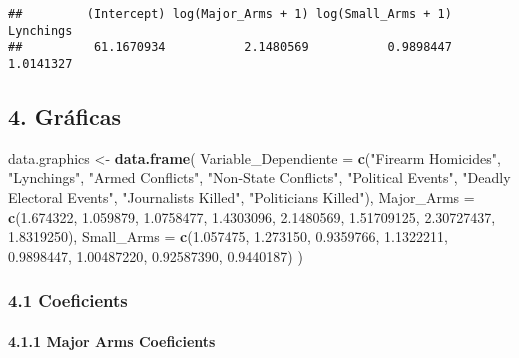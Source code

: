\documentclass[
  11pt,
]{article}
\newenvironment{Shaded}{\begin{snugshade}}{\end{snugshade}}
\newcommand{\AttributeTok}[1]{\textcolor[rgb]{0.13,0.29,0.53}{#1}}
\newcommand{\FloatTok}[1]{\textcolor[rgb]{0.00,0.00,0.81}{#1}}
\newcommand{\FunctionTok}[1]{\textcolor[rgb]{0.13,0.29,0.53}{\textbf{#1}}}
\newcommand{\NormalTok}[1]{#1}
\newcommand{\OtherTok}[1]{\textcolor[rgb]{0.56,0.35,0.01}{#1}}
\newcommand{\StringTok}[1]{\textcolor[rgb]{0.31,0.60,0.02}{#1}}
\begin{document}
\begin{verbatim}
##         (Intercept) log(Major_Arms + 1) log(Small_Arms + 1)           Lynchings 
##          61.1670934           2.1480569           0.9898447           1.0141327
\end{verbatim}

\subsection{4. Gráficas}\label{gruxe1ficas}

\begin{Shaded}
\begin{Highlighting}[]
\NormalTok{data.graphics }\OtherTok{\textless{}{-}} \FunctionTok{data.frame}\NormalTok{(}
  \AttributeTok{Variable\_Dependiente =} \FunctionTok{c}\NormalTok{(}\StringTok{"Firearm Homicides"}\NormalTok{, }\StringTok{"Lynchings"}\NormalTok{, }\StringTok{"Armed Conflicts"}\NormalTok{, }
                           \StringTok{"Non{-}State Conflicts"}\NormalTok{, }\StringTok{"Political Events"}\NormalTok{, }\StringTok{"Deadly Electoral Events"}\NormalTok{, }
                           \StringTok{"Journalists Killed"}\NormalTok{, }\StringTok{"Politicians Killed"}\NormalTok{),}
  \AttributeTok{Major\_Arms =} \FunctionTok{c}\NormalTok{(}\FloatTok{1.674322}\NormalTok{, }\FloatTok{1.059879}\NormalTok{, }\FloatTok{1.0758477}\NormalTok{, }\FloatTok{1.4303096}\NormalTok{, }\FloatTok{2.1480569}\NormalTok{, }\FloatTok{1.51709125}\NormalTok{, }\FloatTok{2.30727437}\NormalTok{, }\FloatTok{1.8319250}\NormalTok{),}
  \AttributeTok{Small\_Arms =} \FunctionTok{c}\NormalTok{(}\FloatTok{1.057475}\NormalTok{, }\FloatTok{1.273150}\NormalTok{, }\FloatTok{0.9359766}\NormalTok{, }\FloatTok{1.1322211}\NormalTok{, }\FloatTok{0.9898447}\NormalTok{, }\FloatTok{1.00487220}\NormalTok{, }\FloatTok{0.92587390}\NormalTok{, }\FloatTok{0.9440187}\NormalTok{)}
\NormalTok{)}
\end{Highlighting}
\end{Shaded}

\subsubsection{4.1 Coeficients}\label{coeficients}

\paragraph{4.1.1 Major Arms Coeficients}\label{major-arms-coeficients}
\end{document}
